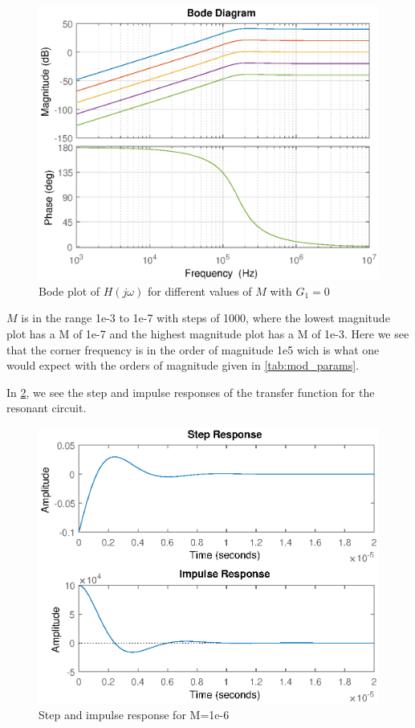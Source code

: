 \begin{figure}[h]
    \centering
    \includegraphics[width=\textwidth]{img/CoilRigBode_M.eps}
    \caption{Bode plot of $H(j\omega)$ for different values of $M$ with $G_1 = 0$}
    \label{fig:bode}
\end{figure}
$M$ is in the range 1e-3 to 1e-7 with steps of 1000, where the lowest magnitude plot has a M of 1e-7 and the highest magnitude plot has a M of 1e-3. Here we see that the corner frequency is in the order of magnitude 1e5 wich is what one would expect with the orders of magnitude given in \cref{tab:mod_params}.

\newpage
In \cref{fig:step}, we see the step and impulse responses of the transfer function for the resonant circuit.

\begin{figure}[h]
    \centering
    \includegraphics[width=\textwidth]{img/CoilRigResponse.eps}
    \caption{Step and impulse response for M=1e-6}
    \label{fig:step}
\end{figure}

